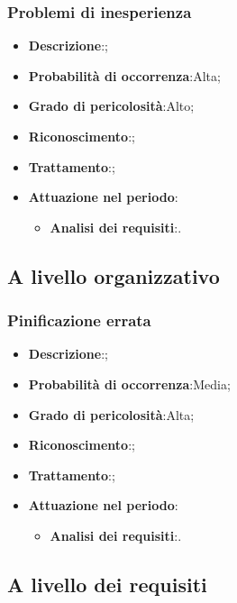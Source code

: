 		\subsubsection{Problemi di inesperienza}
		\begin{itemize}
			\item \textbf{Descrizione}:;
			\item \textbf{Probabilità di occorrenza}:Alta;
			\item \textbf{Grado di pericolosità}:Alto;
			\item \textbf{Riconoscimento}:;	
			\item \textbf{Trattamento}:;
			\item \textbf{Attuazione nel periodo}:
			\begin{itemize}
				\item \textbf{Analisi dei requisiti}:.
			\end{itemize}
		\end{itemize}
	
	\subsection{A livello organizzativo}
		
		\subsubsection{Pinificazione errata}
		\begin{itemize}
			\item \textbf{Descrizione}:;
			\item \textbf{Probabilità di occorrenza}:Media;
			\item \textbf{Grado di pericolosità}:Alta;
			\item \textbf{Riconoscimento}:;	
			\item \textbf{Trattamento}:;
			\item \textbf{Attuazione nel periodo}:
			\begin{itemize}
				\item \textbf{Analisi dei requisiti}:.
			\end{itemize}
		\end{itemize}
	
	\subsection{A livello dei requisiti}
	
